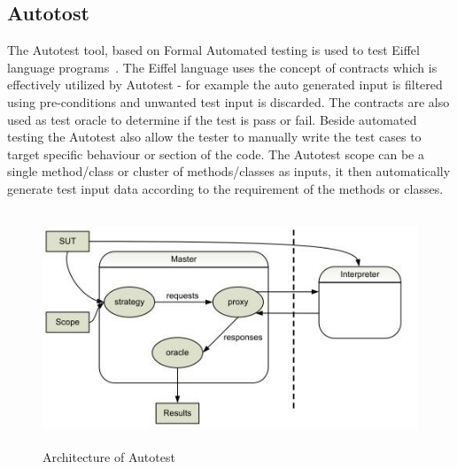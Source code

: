 



\subsection{Autotost}
The Autotest tool, based on Formal Automated testing is used to test Eiffel language programs~\cite{Ciupa2007}. The Eiffel language uses the concept of contracts which is effectively utilized by Autotest - for example the auto generated input is filtered using pre-conditions and unwanted test input is discarded. The contracts are also used as test oracle to determine if the test is pass or fail. Beside automated testing the Autotest also allow the tester to manually write the test cases to target specific behaviour or section of the code. The Autotest scope can be a single method/class or cluster of methods/classes as inputs, it then automatically generate test input data according to the requirement of the methods or classes.

\begin{figure}[h]
	\centering
	\includegraphics[width=13cm, height=7cm]{chapter2/autotest.png}
	\caption{Architecture of Autotest}
	\label{fig:autotest}
\end{figure}

